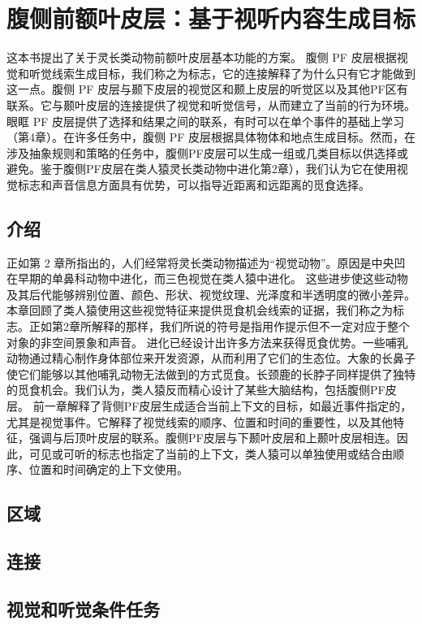\chapter{腹侧前额叶皮层：基于视听内容生成目标}
这本书提出了关于灵长类动物前额叶皮层基本功能的方案。
腹侧 PF 皮层根据视觉和听觉线索生成目标，我们称之为标志，它的连接解释了为什么只有它才能做到这一点。腹侧 PF 皮层与颞下皮层的视觉区和颞上皮层的听觉区以及其他PF区有联系。它与颞叶皮层的连接提供了视觉和听觉信号，从而建立了当前的行为环境。眼眶 PF 皮层提供了选择和结果之间的联系，有时可以在单个事件的基础上学习（第4章）。在许多任务中，腹侧 PF 皮层根据具体物体和地点生成目标。然而，在涉及抽象规则和策略的任务中，腹侧PF皮层可以生成一组或几类目标以供选择或避免。鉴于腹侧PF皮层在类人猿灵长类动物中进化第2章），我们认为它在使用视觉标志和声音信息方面具有优势，可以指导近距离和远距离的觅食选择。
\section{介绍}
正如第 2 章所指出的，人们经常将灵长类动物描述为“视觉动物”。原因是中央凹在早期的单鼻科动物中进化，而三色视觉在类人猿中进化。 这些进步使这些动物及其后代能够辨别位置、颜色、形状、视觉纹理、光泽度和半透明度的微小差异。本章回顾了类人猿使用这些视觉特征来提供觅食机会线索的证据，我们称之为标志。正如第2章所解释的那样，我们所说的符号是指用作提示但不一定对应于整个对象的非空间景象和声音。
进化已经设计出许多方法来获得觅食优势。一些哺乳动物通过精心制作身体部位来开发资源，从而利用了它们的生态位。大象的长鼻子使它们能够以其他哺乳动物无法做到的方式觅食。长颈鹿的长脖子同样提供了独特的觅食机会。我们认为，类人猿反而精心设计了某些大脑结构，包括腹侧PF皮层。
前一章解释了背侧PF皮层生成适合当前上下文的目标，如最近事件指定的，尤其是视觉事件。它解释了视觉线索的顺序、位置和时间的重要性，以及其他特征，强调与后顶叶皮层的联系。腹侧PF皮层与下颞叶皮层和上颞叶皮层相连。因此，可见或可听的标志也指定了当前的上下文，类人猿可以单独使用或结合由顺序、位置和时间确定的上下文使用。
\section{区域}

\section{连接}

\section{视觉和听觉条件任务}

